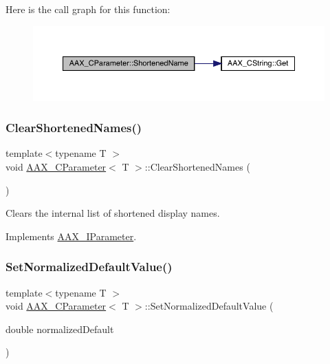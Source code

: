 Here is the call graph for this function\+:
\nopagebreak
\begin{figure}[H]
\begin{center}
\leavevmode
\includegraphics[width=350pt]{a01537_a3a804fb1ba33f9b748294bc868915813_cgraph}
\end{center}
\end{figure}
\mbox{\label{a01537_aaf64cb6bcfb239dc3d60539bc84aca9d}} 
\subsubsection{\texorpdfstring{ClearShortenedNames()}{ClearShortenedNames()}}
{\footnotesize\ttfamily template$<$typename T $>$ \\
void \mbox{\hyperlink{a01537}{A\+A\+X\+\_\+\+C\+Parameter}}$<$ T $>$\+::Clear\+Shortened\+Names (\begin{DoxyParamCaption}{ }\end{DoxyParamCaption})\hspace{0.3cm}{\ttfamily [virtual]}}



Clears the internal list of shortened display names. 



Implements \mbox{\hyperlink{a01857_ae8601be6754169f626269f81f38b4581}{A\+A\+X\+\_\+\+I\+Parameter}}.

\mbox{\label{a01537_aa07573923547b6d2427ad394aac1ca8c}} 
\subsubsection{\texorpdfstring{SetNormalizedDefaultValue()}{SetNormalizedDefaultValue()}}
{\footnotesize\ttfamily template$<$typename T $>$ \\
void \mbox{\hyperlink{a01537}{A\+A\+X\+\_\+\+C\+Parameter}}$<$ T $>$\+::Set\+Normalized\+Default\+Value (\begin{DoxyParamCaption}\item[{double}]{normalized\+Default }\end{DoxyParamCaption})\hspace{0.3cm}{\ttfamily [virtual]}}



